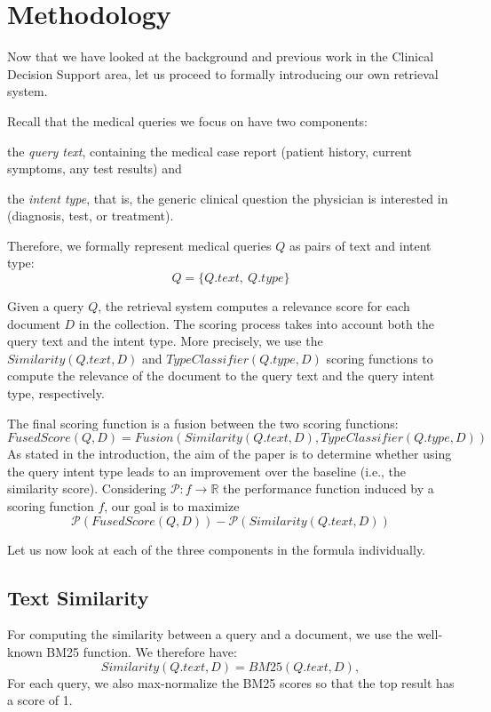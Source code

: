 \chapter{Methodology}

Now that we have looked at the background and previous work in the Clinical Decision Support area,
let us proceed to formally introducing our own retrieval system. 

Recall that the medical queries we focus on have two components:
\begin{enumerate*}[label=\arabic*)]
 \item the \emph{query text}, containing the medical case report (patient history, current symptoms, any test results) and
 \item the \emph{intent type}, that is, the generic clinical question the physician is interested in (diagnosis, test, or treatment).
\end{enumerate*}
Therefore, we formally represent medical queries $Q$ as pairs of text and intent type: \[Q = \{Q.text,\ Q.type\}\]

Given a query $Q$, the retrieval system computes a relevance score for each document $D$ in the collection.
The scoring process takes into account both the query text and the intent type. More precisely, we use the
$Similarity(Q.text, D)$ and $TypeClassifier(Q.type, D)$ scoring functions to compute the relevance of the document to the query text and the
query intent type, respectively.

The final scoring function is a fusion between the two scoring functions:
\[
 FusedScore(Q, D) = Fusion\left(Similarity(Q.text, D), TypeClassifier(Q.type, D)\right)
\]
As stated in the introduction, the aim of the paper is to determine whether using the query intent type leads to an improvement
over the baseline (i.e., the similarity score). Considering $\mathcal{P}: f \rightarrow \mathbb{R}$ the performance function induced
by a scoring function $f$,
our goal is to maximize
\[
 \mathcal{P}(FusedScore(Q,D)) - \mathcal{P}(Similarity(Q.text,D))
\]


Let us now look at each of the three components in the formula individually.

\section{Text Similarity}
For computing the similarity between a query and a document, we use the well-known BM25 function. We therefore have:
\[
Similarity(Q.text, D) = BM25(Q.text,D),%
\]
For each query, we also max-normalize the BM25 scores so that the top result has a score of 1.


